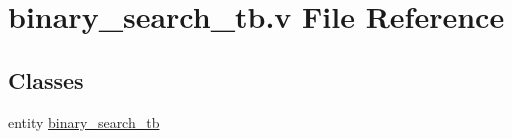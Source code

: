 \hypertarget{binary__search__tb_8v}{}\section{binary\+\_\+search\+\_\+tb.\+v File Reference}
\label{binary__search__tb_8v}
\subsection*{Classes}
\begin{DoxyCompactItemize}
\item 
entity \mbox{\hyperlink{enumbinary__search__tb}{binary\+\_\+search\+\_\+tb}}
\end{DoxyCompactItemize}
